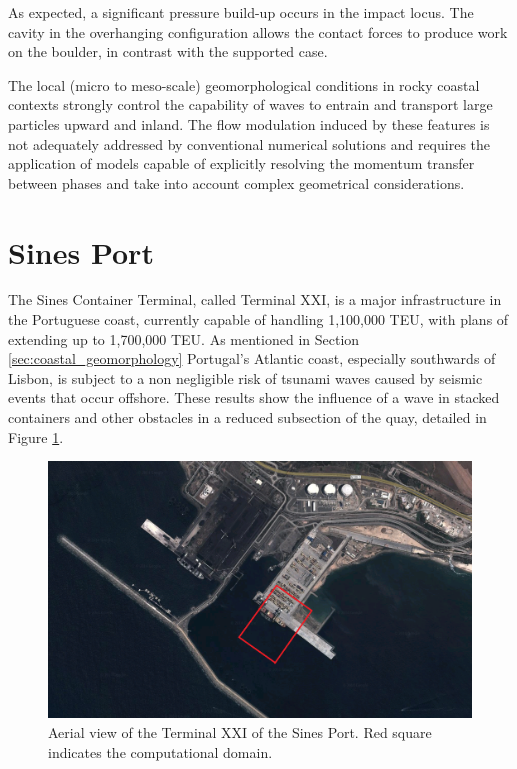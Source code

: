 As expected, a significant pressure build-up occurs in the impact locus. The cavity in the overhanging configuration allows the contact forces to produce work on the boulder, in contrast with the supported case.

The local (micro to meso-scale) geomorphological conditions in rocky coastal contexts strongly control the capability of waves to entrain and transport large particles upward and inland. The flow modulation induced by these features is not adequately addressed by conventional numerical solutions and requires the application of models capable of explicitly resolving the momentum transfer between phases and take into account complex geometrical considerations.





\section{Sines Port}
\label{sec:sines}

The Sines Container Terminal, called Terminal XXI, is a major infrastructure in the Portuguese coast, currently capable of handling 1,100,000 TEU, with plans of extending up to 1,700,000 TEU. As mentioned in Section \ref{sec:coastal_geomorphology} Portugal's Atlantic coast, especially southwards of Lisbon, is subject to a non negligible risk of tsunami waves caused by seismic events that occur offshore. These results show the influence of a wave in stacked containers and other obstacles in a reduced subsection of the quay, detailed in Figure \ref{fig:sines_map}.

%
\begin{figure}[ht!]
	\centering
	\includegraphics[width=0.80\linewidth]{Figures/6.Chapter/map_sines_domain} 
	\caption{Aerial view of the Terminal XXI of the Sines Port. Red square indicates the computational domain.}
	\label{fig:sines_map} 
\end{figure}
%

